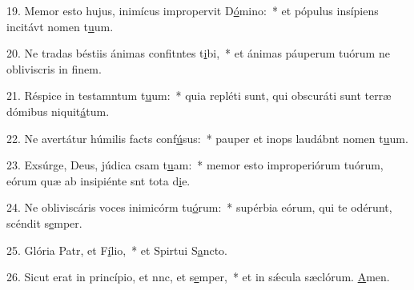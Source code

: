 19. Memor esto hujus, inimícus impropervit D\uline{ó}mino:~* et pópulus insípiens incitávt nomen t\uline{u}um.\par 
20. Ne tradas béstiis ánimas confitntes t\uline{i}bi,~* et ánimas páuperum tuórum ne obliviscris in f\uline{i}nem.\par 
21. Réspice in testamntum t\uline{u}um:~* quia repléti sunt, qui obscuráti sunt terræ dómibus niquit\uline{á}tum.\par 
22. Ne avertátur húmilis facts conf\uline{ú}sus:~* pauper et inops laudábnt nomen t\uline{u}um.\par 
23. Exsúrge, Deus, júdica csam t\uline{u}am:~* memor esto improperiórum tuórum, eórum quæ ab insipiénte snt tota d\uline{i}e.\par 
24. Ne obliviscáris voces inimicórm tu\uline{ó}rum:~* supérbia eórum, qui te odérunt, scéndit s\uline{e}mper.\par 
25. Glória Patr, et F\uline{í}lio,~* et Spirtui S\uline{a}ncto.\par 
26. Sicut erat in princípio, et nnc, et s\uline{e}mper,~* et in sǽcula sæclórum. \uline{A}men.\par 
